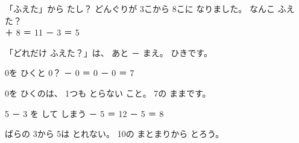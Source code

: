 \begin{tsumazuki}{「ふえた」から たし？}
どんぐりが 3こから 8こに なりました。 なんこ ふえた？\\
\bkbatsu{} ＋ 8 ＝ 11\hspace{3\zw}\bkmaru{} － 3 ＝ 5\par
「どれだけ ふえた？」は、 あと － まえ。 ひきです。
\end{tsumazuki}

\begin{tsumazuki}{0を ひくと 0？}
\bkbatsu{} － 0 ＝ 0\hspace{3\zw}\bkmaru{} － 0 ＝ 7\par
0を ひくのは、 1つも とらない こと。 7の ままです。
\end{tsumazuki}

\begin{tsumazuki}{5 － 3 を して しまう}
\bkbatsu{} － 5 ＝ 12\hspace{3\zw}\bkmaru{} － 5 ＝ 8\par
ばらの 3から 5は とれない。 10の まとまりから とろう。
\end{tsumazuki}




